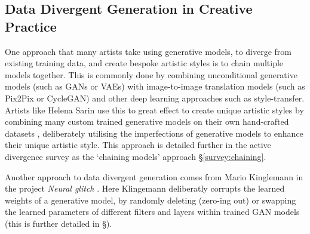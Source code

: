 \subsection{Data Divergent Generation in Creative Practice}
\label{c2:subsec:divergent-practice}

One approach that many artists take using generative models, to diverge from existing training data, and create bespoke artistic styles is to chain multiple models together. 
This is commonly done by combining unconditional generative models (such as GANs or VAEs) with image-to-image translation models (such as Pix2Pix or CycleGAN) and other deep learning approaches such as style-transfer.
Artists like Helena Sarin use this to great effect to create unique artistic styles by combining many custom trained generative models on their own hand-crafted datasets \citep{sarin2018playing}, deliberately utilising the imperfections of generative models to enhance their unique artistic style. 
This approach is detailed further in the active divergence survey as the `chaining models' approach \S \ref{survey:chaining}.

Another approach to data divergent generation comes from Mario Kinglemann in the project \textit{Neural glitch} \citep{klingemann2018neural}. 
Here Klingemann deliberatly corrupts the learned weights of a generative model, by randomly deleting (zero-ing out) or swapping the learned parameters of different filters and layers within trained GAN models (this is further detailed in \S \label{survey:rewriting}). 

